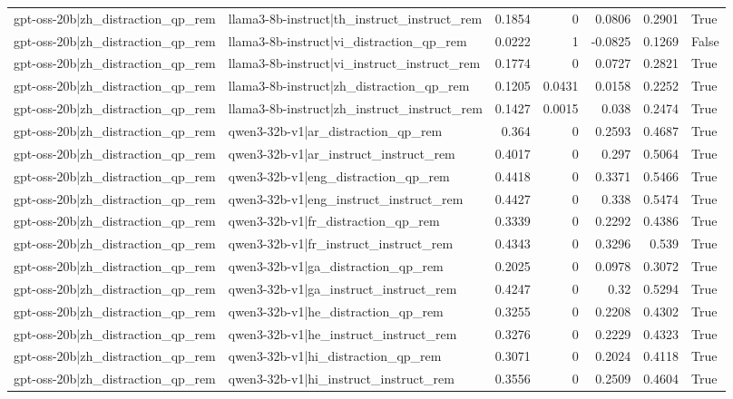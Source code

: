 \begin{table}
\begin{tabular}{l l r r r r l}
gpt-oss-20b|zh_distraction_qp_rem & llama3-8b-instruct|th_instruct_instruct_rem & 0.1854 & 0 & 0.0806 & 0.2901 & True \\
gpt-oss-20b|zh_distraction_qp_rem & llama3-8b-instruct|vi_distraction_qp_rem & 0.0222 & 1 & -0.0825 & 0.1269 & False \\
gpt-oss-20b|zh_distraction_qp_rem & llama3-8b-instruct|vi_instruct_instruct_rem & 0.1774 & 0 & 0.0727 & 0.2821 & True \\
gpt-oss-20b|zh_distraction_qp_rem & llama3-8b-instruct|zh_distraction_qp_rem & 0.1205 & 0.0431 & 0.0158 & 0.2252 & True \\
gpt-oss-20b|zh_distraction_qp_rem & llama3-8b-instruct|zh_instruct_instruct_rem & 0.1427 & 0.0015 & 0.038 & 0.2474 & True \\
gpt-oss-20b|zh_distraction_qp_rem & qwen3-32b-v1|ar_distraction_qp_rem & 0.364 & 0 & 0.2593 & 0.4687 & True \\
gpt-oss-20b|zh_distraction_qp_rem & qwen3-32b-v1|ar_instruct_instruct_rem & 0.4017 & 0 & 0.297 & 0.5064 & True \\
gpt-oss-20b|zh_distraction_qp_rem & qwen3-32b-v1|eng_distraction_qp_rem & 0.4418 & 0 & 0.3371 & 0.5466 & True \\
gpt-oss-20b|zh_distraction_qp_rem & qwen3-32b-v1|eng_instruct_instruct_rem & 0.4427 & 0 & 0.338 & 0.5474 & True \\
gpt-oss-20b|zh_distraction_qp_rem & qwen3-32b-v1|fr_distraction_qp_rem & 0.3339 & 0 & 0.2292 & 0.4386 & True \\
gpt-oss-20b|zh_distraction_qp_rem & qwen3-32b-v1|fr_instruct_instruct_rem & 0.4343 & 0 & 0.3296 & 0.539 & True \\
gpt-oss-20b|zh_distraction_qp_rem & qwen3-32b-v1|ga_distraction_qp_rem & 0.2025 & 0 & 0.0978 & 0.3072 & True \\
gpt-oss-20b|zh_distraction_qp_rem & qwen3-32b-v1|ga_instruct_instruct_rem & 0.4247 & 0 & 0.32 & 0.5294 & True \\
gpt-oss-20b|zh_distraction_qp_rem & qwen3-32b-v1|he_distraction_qp_rem & 0.3255 & 0 & 0.2208 & 0.4302 & True \\
gpt-oss-20b|zh_distraction_qp_rem & qwen3-32b-v1|he_instruct_instruct_rem & 0.3276 & 0 & 0.2229 & 0.4323 & True \\
gpt-oss-20b|zh_distraction_qp_rem & qwen3-32b-v1|hi_distraction_qp_rem & 0.3071 & 0 & 0.2024 & 0.4118 & True \\
gpt-oss-20b|zh_distraction_qp_rem & qwen3-32b-v1|hi_instruct_instruct_rem & 0.3556 & 0 & 0.2509 & 0.4604 & True \\

\end{tabular}
\end{table}
